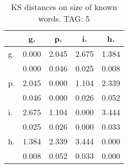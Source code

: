 \begin{table}[h!]
\begin{center}
\begin{tabular}{| l | c | c | c | c |}\hline
 & g. & p. & i. & h. \\\hline
g. & 0.000  & 2.045  & 2.675  & 1.384 \\\hline
 & 0.000  & 0.046  & 0.025  & 0.008 \\\hline
p. & 2.045  & 0.000  & 1.104  & 2.339 \\\hline
 & 0.046  & 0.000  & 0.026  & 0.052 \\\hline
i. & 2.675  & 1.104  & 0.000  & 3.444 \\\hline
 & 0.025  & 0.026  & 0.000  & 0.033 \\\hline
h. & 1.384  & 2.339  & 3.444  & 0.000 \\\hline
 & 0.008  & 0.052  & 0.033  & 0.000 \\\hline
\end{tabular}
\caption{KS distances on size of known words. TAG: 5}
\end{center}
\end{table}